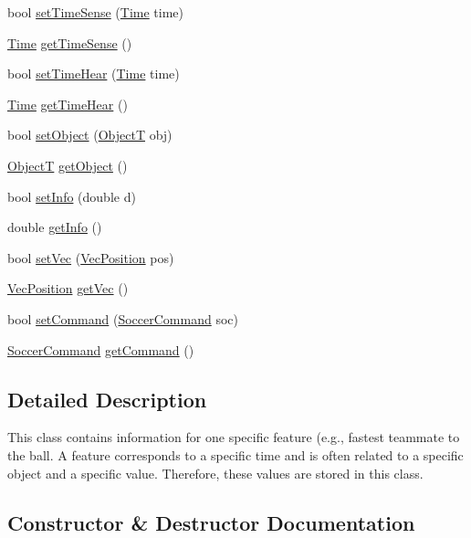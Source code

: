 \begin{DoxyCompactItemize}
bool \hyperlink{classFeature_a1a6c52bd5ab1cc70ffe39a1c20a9a556}{set\+Time\+Sense} (\hyperlink{classTime}{Time} time)
\item 
\hyperlink{classTime}{Time} \hyperlink{classFeature_a9f68128c0ba804df00bc1d25da03c65b}{get\+Time\+Sense} ()
\item 
bool \hyperlink{classFeature_af282805fca320ed0e087dde342ee6e79}{set\+Time\+Hear} (\hyperlink{classTime}{Time} time)
\item 
\hyperlink{classTime}{Time} \hyperlink{classFeature_a2a4657d2b0acd10c5ab5c547dbfaa85f}{get\+Time\+Hear} ()
\item 
bool \hyperlink{classFeature_af710a974e8dcd80c439a7a6ad6c00bb4}{set\+Object} (\hyperlink{SoccerTypes_8h_ad4b701fa66e7d26c054ed15b7820c77c}{ObjectT} obj)
\item 
\hyperlink{SoccerTypes_8h_ad4b701fa66e7d26c054ed15b7820c77c}{ObjectT} \hyperlink{classFeature_acf5901a189ac10a41cb7a3e17fa053de}{get\+Object} ()
\item 
bool \hyperlink{classFeature_a7c2fee01599f7d0cfd4ece91ee8ea145}{set\+Info} (double d)
\item 
double \hyperlink{classFeature_a9c83fc848f317203cd1af047fa2e87b1}{get\+Info} ()
\item 
bool \hyperlink{classFeature_ab0f96ebb874191c1adba7cdf22cc2086}{set\+Vec} (\hyperlink{classVecPosition}{Vec\+Position} pos)
\item 
\hyperlink{classVecPosition}{Vec\+Position} \hyperlink{classFeature_a2e35795fe923586d5292b1bc782f834a}{get\+Vec} ()
\item 
bool \hyperlink{classFeature_a875f14699302699f2ca7cb0a9d311627}{set\+Command} (\hyperlink{classSoccerCommand}{Soccer\+Command} soc)
\item 
\hyperlink{classSoccerCommand}{Soccer\+Command} \hyperlink{classFeature_abfdd2bfd5de65dceee55c862356cfe8d}{get\+Command} ()
\end{DoxyCompactItemize}


\subsection{Detailed Description}
This class contains information for one specific feature (e.\+g., fastest teammate to the ball. A feature corresponds to a specific time and is often related to a specific object and a specific value. Therefore, these values are stored in this class. 

\subsection{Constructor \& Destructor Documentation}
